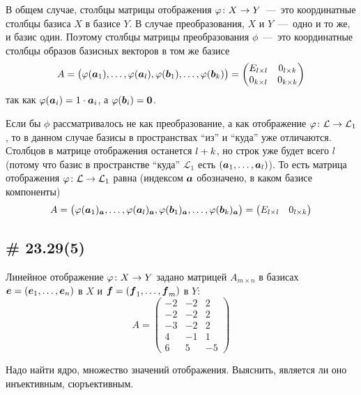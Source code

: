\documentclass[a4paper,12pt]{article}
\begin{document}
\begin{solution}
    В общем случае, столбцы матрицы отображения $\phi\colon X \hm\to Y$~---~это координатные столбцы базиса $X$ в базисе $Y$.
    В случае преобразования, $X$ и $Y$~---~одно и то же, и базис один.
    Поэтому столбцы матрицы преобразования $\phi$~---~это координатные столбцы образов базисных векторов в том же базисе
    \[
      A = \bigl(\varphi(\boldsymbol a_1), \ldots, \varphi(\boldsymbol a_l), \varphi(\boldsymbol b_1), \ldots, \varphi(\boldsymbol b_k)\bigr)
      = \begin{pmatrix}
        E_{l \times l} & 0_{l \times k}\\
        0_{k \times l} & 0_{k \times k}
      \end{pmatrix}
    \]
    так как $\phi(\bds a_i) \hm= 1 \hm\cdot \bds a_i$, а $\phi(\bds b_i) \hm= \bds 0$.
    
    Если бы $\phi$ рассматривалось не как преобразование, а как отображение $\phi\colon \mathcal L \hm\to \mathcal L_1$, то в данном случае базисы в пространствах ``из'' и ``куда'' уже отличаются.
    Столбцов в матрице отображения останется $l \hm+ k$, но строк уже будет всего $l$ (потому что базис в пространстве ``куда'' $\mathcal L_1$ есть $(\boldsymbol a_1, \ldots, \boldsymbol a_l)$).
    То есть матрица отображения $\phi\colon \mathcal L \hm\to \mathcal L_1$ равна (индексом $\boldsymbol a$ обозначено, в каком базисе компоненты)
    \[
      A = \bigl(\varphi(\boldsymbol a_1)_{\boldsymbol a}, \ldots, \varphi(\boldsymbol a_l)_{\boldsymbol a}, \varphi(\boldsymbol b_1)_{\boldsymbol a}, \ldots, \varphi(\boldsymbol b_k)_{\boldsymbol a}\bigr)
      = \begin{pmatrix}
        E_{l \times l} & 0_{l \times k}
      \end{pmatrix}
    \]
  \end{solution}
  
  
  \subsection{\# 23.29(5)}
  
  Линейное отображение $\phi\colon X \hm\to Y$ задано матрицей $A_{m\times n}$ в базисах $\bds e \hm= (\bds e_1, \ldots, \bds e_n)$ в $X$ и $\bds f \hm= (\bds f_1, \ldots, \bds f_m)$ в $Y$:
  \[
    A = \begin{pmatrix}
      -2 & -2 & 2\\
      -2 & -2 & 2\\
      -3 & -2 & 2\\
      4 & -1 & 1\\
      6 & 5 & -5
    \end{pmatrix}
  \]
  
  Надо найти ядро, множество значений отображения.
  Выяснить, является ли оно инъективным, сюръективным.
  
\end{document}
